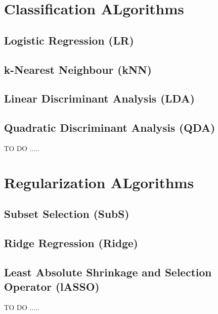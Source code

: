 \documentclass[letterpaper,11pt,english]{sphinxmanual}
\begin{document}
\chapter{Classification ALgorithms}
\label{classification::doc}\label{classification:classification-algorithms}\label{classification:classification}

\section{Logistic Regression (LR)}
\label{classification:logistic-regression-lr}

\section{k-Nearest Neighbour (kNN)}
\label{classification:k-nearest-neighbour-knn}

\section{Linear Discriminant Analysis (LDA)}
\label{classification:linear-discriminant-analysis-lda}

\section{Quadratic Discriminant Analysis (QDA)}
\label{classification:quadratic-discriminant-analysis-qda}
TO DO .....


\chapter{Regularization ALgorithms}
\label{reg:regularization-algorithms}\label{reg::doc}\label{reg:reg}

\section{Subset Selection (SubS)}
\label{reg:subset-selection-subs}

\section{Ridge Regression (Ridge)}
\label{reg:ridge-regression-ridge}

\section{Least Absolute Shrinkage and Selection Operator (lASSO)}
\label{reg:least-absolute-shrinkage-and-selection-operator-lasso}
TO DO .....
\end{document}
